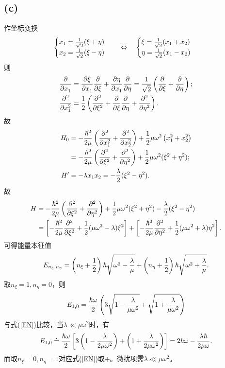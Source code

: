 	\subsection*{(c)}
	作坐标变换
	\begin{align}
		\begin{cases}
			x_1=\frac1{\sqrt2}(\xi+\eta)\\
			x_2=\frac1{\sqrt2}(\xi-\eta)
		\end{cases}\ifnf
		\begin{cases}
			\xi=\frac1{\sqrt2}(x_1+x_2)\\
			\eta=\frac1{\sqrt2}(x_1-x_2)
		\end{cases}
	\end{align}
	则
	\begin{align}
		\pp{x_1}&=\pv\xi{x_1}\pp\xi+\pv\eta{x_1}\pp\eta=\frac1{\sqrt2}\kh{\pp\xi+\pp\eta};\\
		\pp[2]{x_1}&=\frac12\kh{\pp[2]\xi+\pp\xi\pp\eta+\pp[2]\eta}.
	\end{align}
	故
	\begin{align}\notag
		H_0&=-\frac{\hbar^2}{2\mu}\kh{\pp[2]{x_1}+\pp[2]{x_2}}+\frac12\mu\omega^2\kh{x_1^2+x_2^2}\\
		&=-\frac{\hbar^2}{2\mu}\kh{\pp[2]\xi+\pp[2]\eta}+\frac12\mu\omega^2(\xi^2+\eta^2);\\
		H'&=-\lambda x_1x_2=-\frac\lambda{2}(\xi^2-\eta^2).
	\end{align}
	故
	\begin{align}\notag
		H&=-\frac{\hbar^2}{2\mu}\kh{\pp[2]\xi+\pp[2]\eta}+\frac12\mu\omega^2(\xi^2+\eta^2)-\frac\lambda{2}(\xi^2-\eta^2)\\
		&=\fkh{-\frac{\hbar^2}{2\mu}\pp[2]\xi+\frac12(\mu\omega^2-\lambda)\xi^2}+\fkh{-\frac{\hbar^2}{2\mu}\pp[2]\eta+\frac12(\mu\omega^2+\lambda)\eta^2}.
	\end{align}
	可得能量本征值
	\begin{align}
		E_{n_\xi,n_\eta}=\kh{n_\xi+\frac12}\hbar\sqrt{\omega^2-\frac\lambda\mu}+\kh{n_\eta+\frac12}\hbar\sqrt{\omega^2+\frac\lambda\mu}.
	\end{align}
	取$n_\xi=1,n_\eta=0$，则
	\begin{align}
		E_{1,0}=\frac{\hbar\omega}{2}\kh{3\sqrt{1-\frac\lambda{\mu\omega^2}}+\sqrt{1+\frac\lambda{\mu\omega^2}}}
	\end{align}
	与式(\ref{EN})比较，当$\lambda\ll\mu\omega^2$时，有
	\begin{align}
		E_{1,0}\doteq\frac{\hbar\omega}{2}\fkh{3\kh{1-\frac\lambda{2\mu\omega^2}}+\kh{1+\frac\lambda{2\mu\omega^2}}}=2\hbar\omega-\frac{\lambda\hbar}{2\mu\omega}.
	\end{align}
	而取$n_\xi=0,n_\eta=1$对应式(\ref{EN})取$+$。微扰项需$\lambda\ll\mu\omega^2$。

